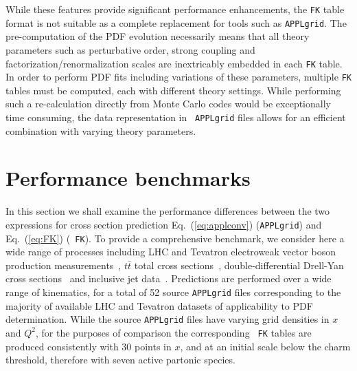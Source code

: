 \documentclass[preprint,12pt]{elsarticle}
\begin{document}
While these features provide significant performance enhancements, the
{\tt FK} table format is not suitable as a complete replacement for
tools such as {\tt APPLgrid}. The pre-computation of the PDF evolution
necessarily means that all theory parameters such as perturbative
order, strong coupling and factorization/renormalization scales are
inextricably embedded in each {\tt FK} table. In order to perform PDF
fits including variations of these parameters, multiple {\tt FK}
tables must be computed, each with different theory settings. While
performing such a re-calculation directly from Monte Carlo codes would
be exceptionally time consuming, the data representation in {\tt
  APPLgrid} files allows for an efficient combination with varying
theory parameters.

\section{Performance benchmarks}
\label{sec:benchmark}

In this section we shall examine the performance differences between
the two expressions for cross section prediction
Eq.~(\ref{eq:applconv}) ({\tt APPLgrid}) and Eq.~(\ref{eq:FK}) ({\tt
  FK}).
%
To provide a comprehensive benchmark, we consider here a wide range of
processes including LHC and Tevatron electroweak vector boson
production
measurements~\cite{Aaij:2012mda,Aaij:2012vn,Chatrchyan:2013mza,Chatrchyan:2013uja,Chatrchyan:2012xt,Aad:2013iua,Aad:2011fp,Aad:2011dm,Aaltonen:2010zza},
$t\bar{t}$ total
cross sections~\cite{ATLAS:2012aa,ATLAS:2011xha,TheATLAScollaboration:2013dja,Chatrchyan:2013faa,Chatrchyan:2012bra,Chatrchyan:2012ria},
double-differential Drell-Yan
cross sections~\cite{Chatrchyan:2013tia,CMS:2014jea} and inclusive jet
data~\cite{Chatrchyan:2012bja,Aad:2011fc,Aad:2013lpa,Abazov:2007jy}. Predictions
are performed over a wide range of kinematics, for a total of 52
source {\tt APPLgrid} files corresponding to the majority of available
LHC and Tevatron datasets of applicability to PDF determination.
While the source {\tt APPLgrid} files have varying grid densities in
$x$ and $Q^2$, for the purposes of comparison the corresponding {\tt
  FK} tables are produced consistently with 30 points in $x$, and at
an initial scale below the charm threshold, therefore with seven
active partonic species.
\end{document}
